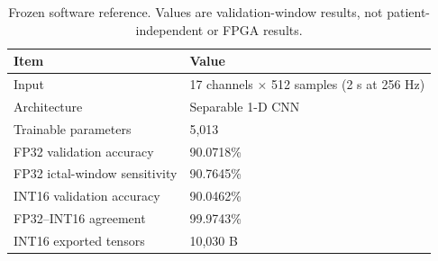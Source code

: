 \begin{table}[t]
\caption{Frozen software reference. Values are validation-window results, not
patient-independent or FPGA results.}
\label{tab:reference-model}
\centering
\footnotesize
\begin{tabular}{ll}
\toprule
Item & Value \\
\midrule
Input & 17 channels $\times$ 512 samples (2 s at 256 Hz) \\
Architecture & Separable 1-D CNN \\
Trainable parameters & 5,013 \\
FP32 validation accuracy & 90.0718\% \\
FP32 ictal-window sensitivity & 90.7645\% \\
INT16 validation accuracy & 90.0462\% \\
FP32--INT16 agreement & 99.9743\% \\
INT16 exported tensors & 10,030 B \\
\bottomrule
\end{tabular}
\end{table}
